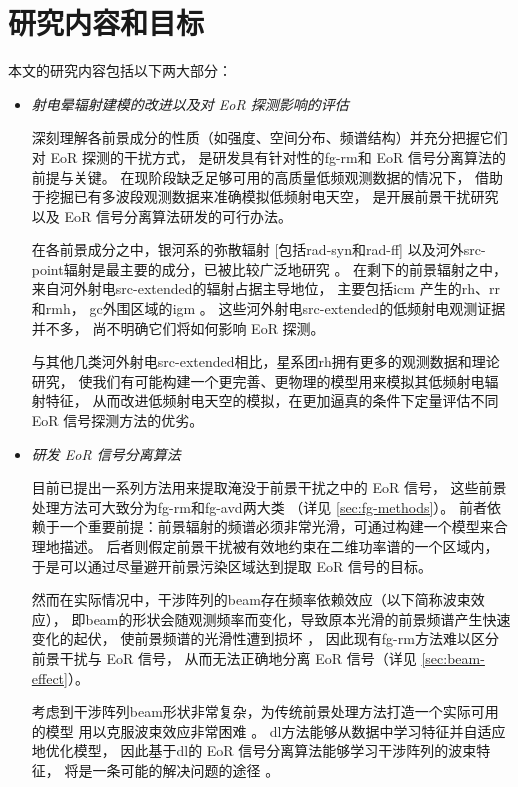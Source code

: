 \section{研究内容和目标}

本文的研究内容包括以下两大部分：
\begin{itemize}
\item \emph{射电晕辐射建模的改进以及对 EoR 探测影响的评估}

\hspace{2\ccwd}%
深刻理解各前景成分的性质（如强度、空间分布、频谱结构）并充分把握它们对 EoR 探测的干扰方式，
是研发具有针对性的\ac{fg-rm}和 EoR 信号分离算法的前提与关键。
在现阶段缺乏足够可用的高质量低频观测数据的情况下，
借助于挖掘已有多波段观测数据来准确模拟低频射电天空，
是开展前景干扰研究以及 EoR 信号分离算法研发的可行办法。

\hspace{2\ccwd}%
在各前景成分之中，银河系的弥散辐射 [包括\ac{rad-syn}和\ac{rad-ff}]
以及河外\ac{src-point}辐射是最主要的成分，已被比较广泛地研究
\cite{shaver1999,diMatteo2004,gleser2008,liu2012,murray2017,spinelli2018}。
在剩下的前景辐射之中，来自河外射电\ac{src-extended}的辐射占据主导地位，
主要包括\ac{icm} \cite{feretti2012} 产生的\ac{rh}、\ac{rr}和\ac{rmh}，
\ac{gc}外围区域的\ac{igm} \cite{keshet2004}。
这些河外射电\ac{src-extended}的低频射电观测证据并不多，
尚不明确它们将如何影响 EoR 探测。

\hspace{2\ccwd}%
与其他几类河外射电\ac{src-extended}相比，星系团\ac{rh}拥有更多的观测数据和理论研究，
使我们有可能构建一个更完善、更物理的模型用来模拟其低频射电辐射特征，
从而改进低频射电天空的模拟，在更加逼真的条件下定量评估不同 EoR 信号探测方法的优劣。

\item \emph{研发 EoR 信号分离算法}

\hspace{2\ccwd}%
目前已提出一系列方法用来提取淹没于前景干扰之中的 EoR 信号，
这些前景处理方法可大致分为\ac{fg-rm}和\ac{fg-avd}两大类 \cite{chapman2016}
（详见 \autoref{sec:fg-methods}）。
前者依赖于一个重要前提：前景辐射的频谱必须非常光滑，可通过构建一个模型来合理地描述。
后者则假定前景干扰被有效地约束在二维功率谱的一个区域内，
于是可以通过尽量避开前景污染区域达到提取 EoR 信号的目标。

\hspace{2\ccwd}%
然而在实际情况中，干涉阵列的\ac{beam}存在频率依赖效应（以下简称波束效应），
即\ac{beam}的形状会随观测频率而变化，导致原本光滑的前景频谱产生快速变化的起伏，
使前景频谱的光滑性遭到损坏 \cite{liu2009ps}，
因此现有\ac{fg-rm}方法难以区分前景干扰与 EoR 信号，
从而无法正确地分离 EoR 信号（详见 \autoref{sec:beam-effect}）。

\hspace{2\ccwd}%
考虑到干涉阵列\ac{beam}形状非常复杂，为传统前景处理方法打造一个实际可用的模型
用以克服波束效应非常困难 \cite{lochner2015}。
\ac{dl}方法能够从数据中学习特征并自适应地优化模型，
因此基于\ac{dl}的 EoR 信号分离算法能够学习干涉阵列的波束特征，
将是一条可能的解决问题的途径 \cite{herbel2018,vafaeiSadr2019}。

\end{itemize}

